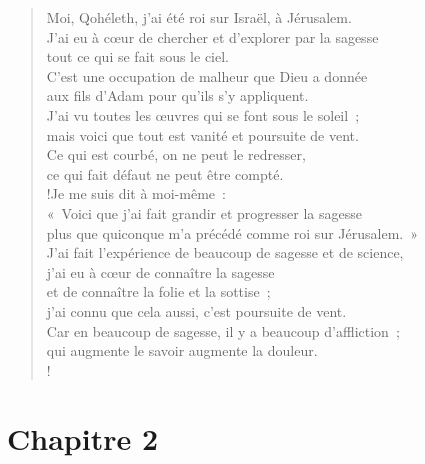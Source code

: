 \documentclass[french,twoside]{book} %
\begin{document}
\begin{verse}
Moi, Qohéleth, j’ai été roi sur Israël, à Jérusalem.\\
J’ai eu à cœur de chercher et d’explorer par la sagesse \\
tout ce qui se fait sous le ciel. \\
C’est une occupation de malheur que Dieu a donnée \\
aux fils d’Adam pour qu’ils s’y appliquent.\\
J’ai vu toutes les œuvres qui se font sous le soleil ; \\
mais voici que tout est vanité et poursuite de vent.\\
Ce qui est courbé, on ne peut le redresser, \\
ce qui fait défaut ne peut être compté.\\!Je me suis dit à moi-même : \\
« Voici que j’ai fait grandir et progresser la sagesse \\
plus que quiconque m’a précédé comme roi sur Jérusalem. » \\
J’ai fait l’expérience de beaucoup de sagesse et de science,\\
j’ai eu à cœur de connaître la sagesse \\
et de connaître la folie et la sottise ; \\
j’ai connu que cela aussi, c’est poursuite de vent.\\
Car en beaucoup de sagesse, il y a beaucoup d’affliction ; \\
qui augmente le savoir augmente la douleur.\\!
\end{verse}
\section[{Chapitre 2}]{Chapitre 2}\renewcommand{\leftmark}{Chapitre 2}
\end{document}
